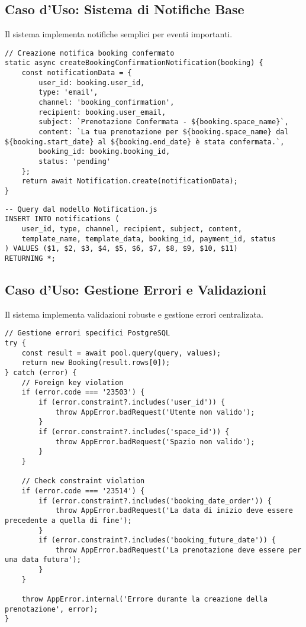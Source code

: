 \subsection{Caso d'Uso: Sistema di Notifiche Base}

Il sistema implementa notifiche semplici per eventi importanti.

\begin{lstlisting}[caption=Creazione Notifica Email (NotificationService.js)]
// Creazione notifica booking confermato
static async createBookingConfirmationNotification(booking) {
    const notificationData = {
        user_id: booking.user_id,
        type: 'email',
        channel: 'booking_confirmation',
        recipient: booking.user_email,
        subject: `Prenotazione Confermata - ${booking.space_name}`,
        content: `La tua prenotazione per ${booking.space_name} dal ${booking.start_date} al ${booking.end_date} è stata confermata.`,
        booking_id: booking.booking_id,
        status: 'pending'
    };
    return await Notification.create(notificationData);
}
\end{lstlisting}

\begin{lstlisting}[caption=Query Inserimento Notifica]
-- Query dal modello Notification.js
INSERT INTO notifications (
    user_id, type, channel, recipient, subject, content,
    template_name, template_data, booking_id, payment_id, status
) VALUES ($1, $2, $3, $4, $5, $6, $7, $8, $9, $10, $11)
RETURNING *;
\end{lstlisting}

\subsection{Caso d'Uso: Gestione Errori e Validazioni}

Il sistema implementa validazioni robuste e gestione errori centralizata.

\begin{lstlisting}[caption=Gestione Errori Database (Booking.js)]
// Gestione errori specifici PostgreSQL
try {
    const result = await pool.query(query, values);
    return new Booking(result.rows[0]);
} catch (error) {
    // Foreign key violation
    if (error.code === '23503') {
        if (error.constraint?.includes('user_id')) {
            throw AppError.badRequest('Utente non valido');
        }
        if (error.constraint?.includes('space_id')) {
            throw AppError.badRequest('Spazio non valido');
        }
    }
    
    // Check constraint violation
    if (error.code === '23514') {
        if (error.constraint?.includes('booking_date_order')) {
            throw AppError.badRequest('La data di inizio deve essere precedente a quella di fine');
        }
        if (error.constraint?.includes('booking_future_date')) {
            throw AppError.badRequest('La prenotazione deve essere per una data futura');
        }
    }
    
    throw AppError.internal('Errore durante la creazione della prenotazione', error);
}
\end{lstlisting}

